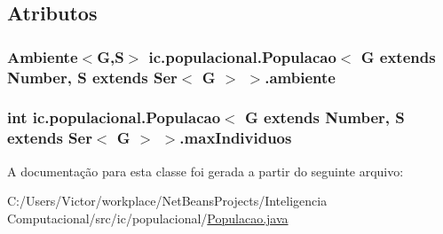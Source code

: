 \subsection{Atributos}
\hypertarget{classic_1_1populacional_1_1_populacao_3_01_g_01extends_01_number_00_01_s_01extends_01_ser_3_01_g_01_4_01_4_a26077a80e3d7cefbedda10fd28425144}{
\subsubsection[{ambiente}]{\setlength{\rightskip}{0pt plus 5cm}Ambiente$<$G,S$>$ ic.\-populacional.\-Populacao$<$ G extends Number, S extends Ser$<$ G $>$ $>$.ambiente\hspace{0.3cm}{\ttfamily [protected]}}}\label{classic_1_1populacional_1_1_populacao_3_01_g_01extends_01_number_00_01_s_01extends_01_ser_3_01_g_01_4_01_4_a26077a80e3d7cefbedda10fd28425144}
\hypertarget{classic_1_1populacional_1_1_populacao_3_01_g_01extends_01_number_00_01_s_01extends_01_ser_3_01_g_01_4_01_4_a45ee056bf518cbc3714bfc29d0efa2b0}{
\subsubsection[{max\-Individuos}]{\setlength{\rightskip}{0pt plus 5cm}int ic.\-populacional.\-Populacao$<$ G extends Number, S extends Ser$<$ G $>$ $>$.max\-Individuos\hspace{0.3cm}{\ttfamily [private]}}}\label{classic_1_1populacional_1_1_populacao_3_01_g_01extends_01_number_00_01_s_01extends_01_ser_3_01_g_01_4_01_4_a45ee056bf518cbc3714bfc29d0efa2b0}


A documentação para esta classe foi gerada a partir do seguinte arquivo\-:\begin{DoxyCompactItemize}
\item 
C\-:/\-Users/\-Victor/workplace/\-Net\-Beans\-Projects/\-Inteligencia Computacional/src/ic/populacional/\hyperlink{_populacao_8java}{Populacao.\-java}\end{DoxyCompactItemize}
